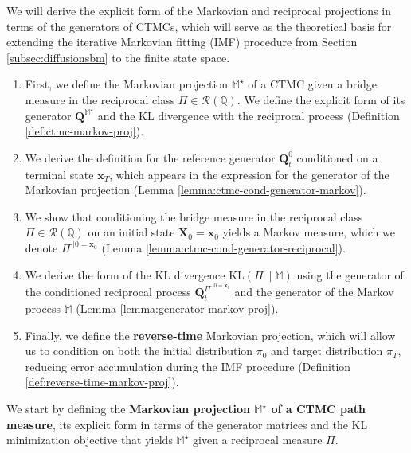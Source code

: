 \documentclass{article}
\begin{document}
We will derive the explicit form of the Markovian and reciprocal projections in terms of the generators of CTMCs, which will serve as the theoretical basis for extending the iterative Markovian fitting (IMF) procedure from Section \ref{subsec:diffusionsbm} to the finite state space.
\begin{enumerate}
    \item [(i)] First, we define the Markovian projection $\mathbb{M}^\star$ of a CTMC given a bridge measure in the reciprocal class $\Pi\in \mathcal{R}(\mathbb{Q})$. We define the explicit form of its generator $\boldsymbol{Q}^{\mathbb{M}^\star}$ and the KL divergence with the reciprocal process (Definition \ref{def:ctmc-markov-proj}).
    \item[(ii)] We derive the definition for the reference generator $\boldsymbol{Q}^0_t$ conditioned on a terminal state $\boldsymbol{x}_T$, which appears in the expression for the generator of the Markovian projection (Lemma \ref{lemma:ctmc-cond-generator-markov}).
    \item[(iii)] We show that conditioning the bridge measure in the reciprocal class $\Pi\in \mathcal{R}(\mathbb{Q})$ on an initial state $\boldsymbol{X}_0=\boldsymbol{x}_0$ yields a Markov measure, which we denote $\Pi^{\cdot|0=\boldsymbol{x}_0}$ (Lemma \ref{lemma:ctmc-cond-generator-reciprocal}).
    \item[(iv)] We derive the form of the KL divergence $\text{KL}(\Pi\|\mathbb{M})$ using the generator of the conditioned reciprocal process $\boldsymbol{Q}_t^{\Pi^{\cdot|0=\boldsymbol{x}_0}}$ and the generator of the Markov process $\mathbb{M}$ (Lemma \ref{lemma:generator-markov-proj}).
    \item [(v)] Finally, we define the \textbf{reverse-time} Markovian projection, which will allow us to condition on both the initial distribution $\pi_0$ and target distribution $\pi_T$, reducing error accumulation during the IMF procedure (Definition \ref{def:reverse-time-markov-proj}).
\end{enumerate}

We start by defining the \textbf{Markovian projection $\mathbb{M}^\star$ of a CTMC path measure}, its explicit form in terms of the generator matrices and the KL minimization objective that yields $\mathbb{M}^\star$ given a reciprocal measure $\Pi$.
\end{document}
